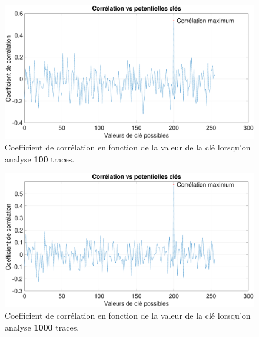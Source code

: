 \documentclass[10pt, oneside, a4paper]{article}
\begin{document}
\begin{figure}[htbp]
    \centering
    \hspace{-1.2 cm}
    \includegraphics[scale=0.25]{image/100.eps}    \caption{Coefficient de corrélation en fonction de la valeur de la clé lorsqu'on analyse \textbf{100} traces.}    \label{fig:100}
\end{figure}

\begin{figure}[htbp]
    \centering
    \hspace{-1.2 cm}   
    \includegraphics[scale=0.25]{image/1000.eps}    \caption{Coefficient de corrélation en fonction de la valeur de la clé lorsqu'on analyse \textbf{1000} traces.}    \label{fig:1000}
\end{figure}

\newpage
\end{document}
